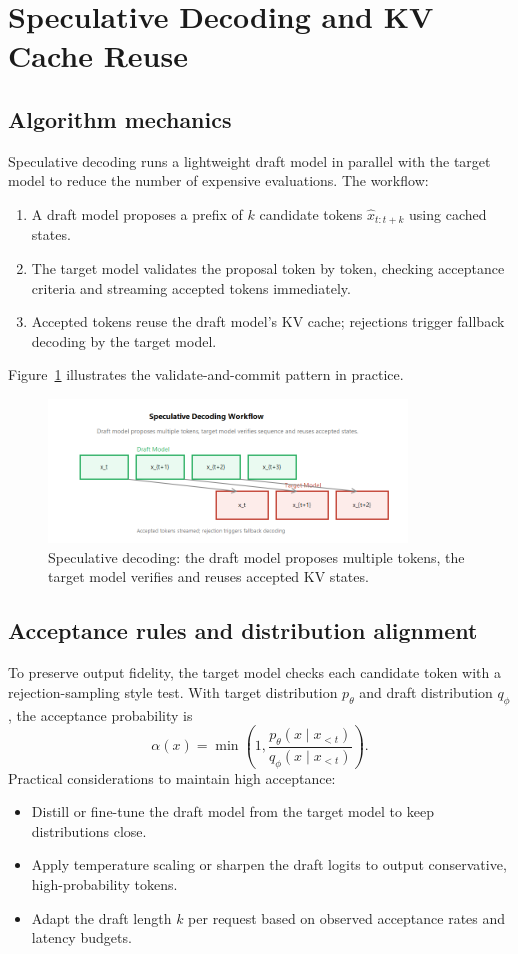 \documentclass{article}
\begin{document}
\section{Speculative Decoding and KV Cache Reuse}
\subsection{Algorithm mechanics}
Speculative decoding runs a lightweight draft model in parallel with the target model to reduce the number of expensive evaluations. The workflow:
\begin{enumerate}
  \item A draft model proposes a prefix of $k$ candidate tokens $\hat{x}_{t:t+k}$ using cached states.
  \item The target model validates the proposal token by token, checking acceptance criteria and streaming accepted tokens immediately.
  \item Accepted tokens reuse the draft model's KV cache; rejections trigger fallback decoding by the target model.
\end{enumerate}
Figure~\ref{fig:speculative_en} illustrates the validate-and-commit pattern in practice.
\begin{figure}[H]
  \centering
  \includegraphics[width=0.85\textwidth]{speculative_decoding.png}
  \caption{Speculative decoding: the draft model proposes multiple tokens, the target model verifies and reuses accepted KV states.}
  \label{fig:speculative_en}
\end{figure}

\subsection{Acceptance rules and distribution alignment}
To preserve output fidelity, the target model checks each candidate token with a rejection-sampling style test. With target distribution $p_\theta$ and draft distribution $q_\phi$, the acceptance probability is
\begin{equation}
  \alpha(x) = \min\left(1, \frac{p_\theta(x \mid x_{<t})}{q_\phi(x \mid x_{<t})}\right).
\end{equation}
Practical considerations to maintain high acceptance:
\begin{itemize}
  \item Distill or fine-tune the draft model from the target model to keep distributions close.
  \item Apply temperature scaling or sharpen the draft logits to output conservative, high-probability tokens.
  \item Adapt the draft length $k$ per request based on observed acceptance rates and latency budgets.
\end{itemize}
\end{document}

